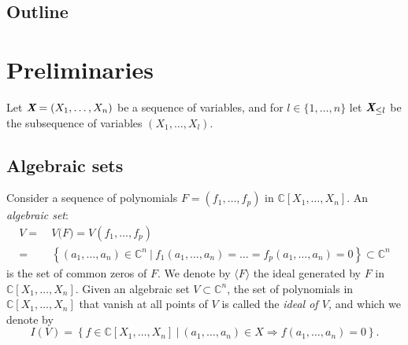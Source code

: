 \documentclass[a4paper]{article}
\def\Xb{\textit{\textbf{X}}}
\def\C{\mathbb{C}}
\begin{document}
\subsection{Outline}



















\section{Preliminaries}
Let $\Xb = (X_1, \hdots , X_n)$ be a sequence of variables, and for $l \in \{1,\hdots,n\}$ let $\Xb_{\leq l}$ be the subsequence of variables $(X_1, \hdots , X_l)$.



\subsection{Algebraic sets} 
Consider a sequence of polynomials $F=(f_1,\hdots,f_p)$ in $\C[X_1,\hdots,X_n].$
An \textit{algebraic set}: 
\begin{align*}
V = ~&V\big(F) = V(f_1,\hdots,f_p) \\
= ~&\left\{(a_1,\hdots,a_n) \in \C^n~|~f_1(a_1,\hdots,a_n)=\hdots=f_p(a_1,\hdots,a_n)=0\right\} \subset \C^n
\end{align*}
is the set of common zeros of $F$. We denote by $\langle F \rangle$ the ideal generated by $F$ in $\C[X_1,\hdots,X_n]$. Given an algebraic set $V \subset \C^n$, the set of polynomials in $\C[X_1,\hdots, X_n]$ that vanish at all points of $V$ is called the \textit{ideal of $V$,} and which we denote by
\[
I(V) = \left\{f \in \C[X_1,\hdots,X_n]~|~(a_1,\hdots,a_n) \in X \Rightarrow f(a_1,\hdots,a_n)=0\right\}. 
\]





\end{document}
